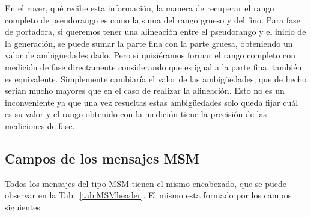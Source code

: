 \documentclass[a4paper,12pt,oneside,onecolumn,final,openright]{book}%
\begin{document}
	En el rover, qué recibe esta información, la manera de recuperar el rango completo de pseudorango es como la suma del rango grueso y del fino. Para fase de portadora, si queremos tener una alineación entre el pseudorango y el inicio de la generación, se puede sumar la parte fina con la parte gruesa, obteniendo un valor de ambigüedades dado. Pero si quisiéramos formar el rango completo con medición de fase directamente considerando que es igual a la parte fina, también es equivalente. Simplemente cambiaría el valor de las ambigüedades, que de hecho serían mucho mayores que en el caso de realizar la alineación. Esto no es un inconveniente ya que una vez resueltas estas ambigüedades solo queda fijar cuál es su valor y el rango obtenido con la medición tiene la precisión de las mediciones de fase.

\subsection{Campos de los mensajes MSM}\label{sec:campos_MSM}
	Todos los mensajes del tipo MSM tienen el mismo encabezado, que se puede observar en la Tab.~\ref{tab:MSMheader}. El mismo esta formado por los campos siguientes.
\end{document}
